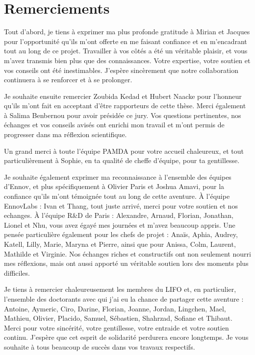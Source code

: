 \pagestyle{fancy}


\frontmatter
\section*{Remerciements}

Tout d’abord, je tiens à exprimer ma plus profonde gratitude à Mirian et Jacques pour l’opportunité qu'ils m'ont offerte en me faisant confiance et en m'encadrant tout au long de ce projet.
Travailler à vos côtés a été un véritable plaisir, et vous m'avez transmis bien plus que des connaissances.
Votre expertise, votre soutien et vos conseils ont été inestimables. 
J'espère sincèrement que notre collaboration continuera à se renforcer et à se prolonger.

Je souhaite ensuite remercier Zoubida Kedad et Hubert Naacke pour l'honneur qu'ils m'ont fait en acceptant d'être rapporteurs de cette thèse.
Merci également à Salima Benbernou pour avoir présidée ce jury.
Vos questions pertinentes, nos échanges et vos conseils avisés ont enrichi mon travail et m'ont permis de progresser dans ma réflexion scientifique.

Un grand merci à toute l'équipe PAMDA pour votre accueil chaleureux, et tout particulièrement à Sophie, en ta qualité de cheffe d'équipe, pour ta gentillesse.

Je souhaite également exprimer ma reconnaissance à l’ensemble des équipes d’Ennov, et plus spécifiquement à Olivier Paris et Joshua Amavi, pour la confiance qu'ils m'ont témoignée tout au long de cette aventure.
À l'équipe EnnovLabs : Ivan et Thang, tout juste arrivé, merci pour votre soutien et nos echanges.
À l'équipe R\&D de Paris : Alexandre, Arnaud, Florian, Jonathan, Lionel et Nhu, vous avez égayé mes journées et m'avez beaucoup appris.
Une pensée particulière également pour les chefs de projet : Anaïs, Aphia, Audrey, Katell, Lilly, Marie, Maryna et Pierre, ainsi que pour Anissa, Colm, Laurent, Mathilde et Virginie.
Nos échanges riches et constructifs ont non seulement nourri mes réflexions, mais ont aussi apporté un véritable soutien lors des moments plus difficiles.

Je tiens à remercier chaleureusement les membres du LIFO et, en particulier, l'ensemble des doctorants avec qui j'ai eu la chance de partager cette aventure : Antoine, Aymeric, Ciro, Darine, Florian, Joanne, Jordan, Lingchen, Mael, Mathieu, Olivier, Placido, Samuel, Sébastien, Shahrzad, Sofiane et Thibaut.
Merci pour votre sincérité, votre gentillesse, votre entraide et votre soutien continu.
J'espère que cet esprit de solidarité perdurera encore longtemps.
Je vous souhaite à tous beaucoup de succès dans vos travaux respectifs.

